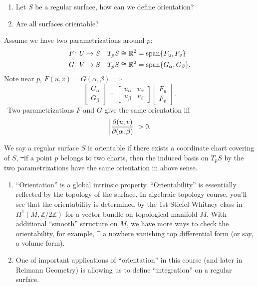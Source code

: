 \begin{question}\hfill
\begin{enumerate}[(1)]
    \item Let \(S\) be a regular surface, how can we define orientation?
    \item Are all surfaces orientable?
\end{enumerate}
\end{question}

Assume we have two parametrizations around \(p\):
\begin{align*}
    F&\colon U\to S &&T_p S\cong \mathbb{R}^2=\operatorname{span}\{F_u,F_v\} \\
    G&\colon V\to S &&T_p S\cong \mathbb{R}^2=\operatorname{span}\{G_\alpha,G_\beta\}
.\end{align*}
Note near \(p\), \(F(u,v)=G(\alpha,\beta)\implies \) \[
    \begin{bmatrix}
        G_\alpha \\ G_\beta
    \end{bmatrix}=\begin{bmatrix}
        u_\alpha & v_\alpha \\
        u_\beta & v_\beta
    \end{bmatrix}\begin{bmatrix}
        F_u \\ F_v
    \end{bmatrix}
.\] 
\ie\ Two parametrizations \(F\) and \(G\) give the same orientation iff \[
    \left|\pdv{(u,v)}{(\alpha,\beta)}\right|>0
.\] 

\begin{definition}
    We say a regular surface \(S\) is orientable if there exists a coordinate
    chart covering of \(S\), \st\ if a point \(p\) belongs to two charts, then the
    induced basis on \(T_p S\) by the two parametrizations have the same orientation
    in above sense.
\end{definition}

\begin{remark}\hfill
\begin{enumerate}[(1)]
    \item ``Orientation'' is a global intrinsic property. ``Orientability'' is
    essentially reflected by the topology of the surface. In algebraic topology
    course, you'll see that the orientability is determined by the 1st
    Stiefel-Whitney class in \(H^1(M,\mathbb{Z}/2\mathbb{Z})\) for a vector
    bundle on topological manifold \(M\).
    With additional ``smooth'' structure on \(M\), we have more ways to check
    the orientability, for example, \(\exists\) a nowhere vanishing top
    differential form (or say, a volume form).
    \item One of important applications of ``orientation'' in this course (and
    later in Reimann Geometry) is allowing us to define ``integration'' on a regular
    surface.
\end{enumerate}
\end{remark}

